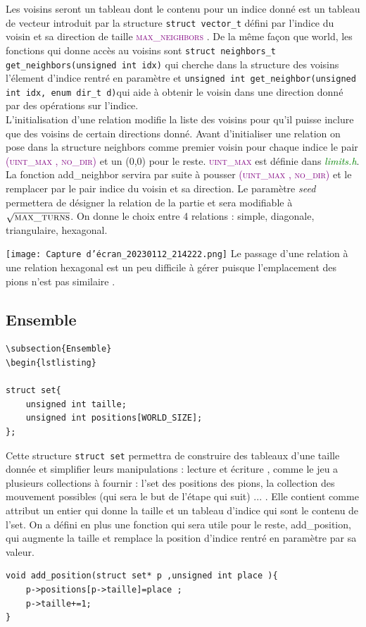 \documentclass[a4paper]{article}
\begin{document}
Les voisins seront un tableau dont le contenu pour un indice donné est un tableau de vecteur introduit par la structure \lstinline|struct vector_t| défini par l’indice
 du voisin et sa direction de taille \textcolor{purple}{\textsc{max\_neighbors}} . De la même façon que world, les fonctions qui donne 
 accès au voisins sont \lstinline|struct neighbors_t get_neighbors(unsigned int idx)| qui cherche dans la structure des voisins 
 l’élement d’indice rentré en paramètre et \lstinline|unsigned int get_neighbor(unsigned int idx, enum dir_t d)|qui aide à obtenir 
 le voisin dans une direction donné par des opérations sur l’indice.\\ 

L’initialisation d’une relation modifie la liste des voisins pour qu’il puisse inclure que des voisins de certain directions donné. 
Avant d’initialiser une relation on pose dans la structure neighbors comme premier voisin pour chaque indice le pair 
\textcolor{purple}{\textsc{(uint\_max , no\_dir)}} et un (0,0) pour le reste. \textcolor{purple}{\textsc{uint\_max}} est définie 
dans \textcolor{green}{\textit{limits.h}}. La fonction add\_neighbor servira par suite à pousser \textcolor{purple}{\textsc{(uint\_max , no\_dir)}} 
et le remplacer par le pair indice du voisin et sa direction.
Le paramètre \textit{seed} permettera de désigner la relation de la partie et sera modifiable à $\sqrt{\textsc{max\_turns}}$. On donne le choix entre 4 relations : simple, diagonale, triangulaire, hexagonal.

\texttt{[image: Capture d'écran\_20230112\_214222.png]}
Le passage d'une relation à une relation hexagonal est un peu difficile à gérer puisque l'emplacement des pions n'est pas similaire .  

\subsection{Ensemble}
\begin{lstlisting}
\subsection{Ensemble}
\begin{lstlisting}

struct set{
    unsigned int taille;
    unsigned int positions[WORLD_SIZE];
};
\end{lstlisting}
Cette structure \lstinline|struct set|  permettra de construire des tableaux d’une taille donnée et simplifier leurs 
manipulations : lecture et écriture , comme le jeu a plusieurs collections à fournir : l’set des positions des pions, la 
collection des mouvement possibles (qui sera le but de l’étape qui suit) ... . Elle contient comme attribut un entier qui donne la 
taille et un tableau d'indice qui sont le contenu de l'set.
On a défini en plus une fonction qui sera utile pour le reste, add\_position, qui augmente la taille et remplace la position d’indice 
rentré en paramètre par sa valeur. 
\begin{lstlisting}
void add_position(struct set* p ,unsigned int place ){
    p->positions[p->taille]=place ;
    p->taille+=1;
}
\end{lstlisting}
\end{document}
